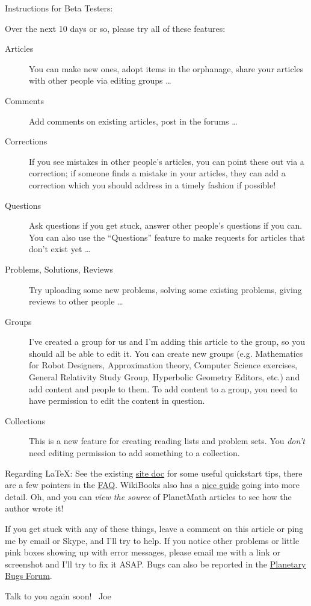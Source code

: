 \documentclass[12pt]{article}
\begin{document}
Instructions for Beta Testers:

Over the next 10 days or so, please try all of these features:

\begin{description}
\item[Articles] You can make new ones, adopt items in the orphanage, share your articles with other people via editing groups \ldots
\item[Comments] Add comments on existing articles, post in the forums \ldots
\item[Corrections] If you see mistakes in other people's articles, you can point these out via a correction; if someone finds a mistake in your articles, they can add a correction which you should address in a timely fashion if possible!
\item[Questions] Ask questions if you get stuck, answer other people's questions if you can.  You can also use the ``Questions'' feature to make requests for articles that don't exist yet \ldots
\item[Problems, Solutions, Reviews] Try uploading some new problems, solving some existing problems, giving reviews to other people \ldots
\item[Groups] I've created a group for us and I'm adding this article to the group, so you should all be able to edit it.  You can create new groups (e.g. Mathematics for Robot Designers, Approximation theory, Computer Science exercises, General Relativity Study Group, Hyperbolic Geometry Editors, etc.) and add content and people to them.  To add content to a group, you need to have permission to edit the content in question.
\item[Collections] This is a new feature for creating reading lists and problem sets.  You \emph{don't} need editing permission to add something to a collection.  
\end{description}

Regarding LaTeX:  See the existing \href{http://planetmath.org/TeXMathematicalFormulaQuickReference}{site doc} for some useful quickstart tips, there are a few pointers in the \href{http://planetmath.org/theplanetmathfaq1}{FAQ}.  WikiBooks also has a \href{http://en.wikibooks.org/wiki/LaTeX}{nice guide} going into more detail.  Oh, and you can \emph{view the source} of PlanetMath articles to see how the author wrote it!

If you get stuck with any of these things, leave a comment on this article or ping me by email or Skype, and I'll try to help.  If you notice other problems or little pink boxes showing up with error messages, please email me with a link or screenshot and I'll try to fix it ASAP.  Bugs can also be reported in the \href{http://planetmath.org/forums/planetary-bugs}{Planetary Bugs Forum}.

Talk to you again soon! ~Joe
\end{document}
